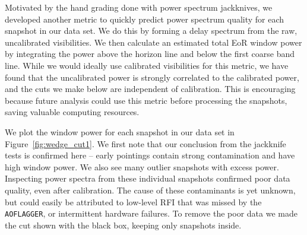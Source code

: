\documentclass[iop]{emulateapj}
\begin{document}
Motivated by the hand grading done with power spectrum jackknives, we developed 
another metric to quickly predict power spectrum quality for each snapshot in our data set. 
We do this by forming a delay spectrum \citep{Parsons:2012b} from the raw, uncalibrated 
visibilities. We then calculate an estimated total EoR window power by integrating the 
power above the horizon line and below the first coarse band line. While we would ideally 
use calibrated visibilities for this metric, we have found that the uncalibrated power is 
strongly correlated to the calibrated power, and the cuts we make below are independent of 
calibration. This is encouraging because future analysis could use this metric before 
processing the snapshots, saving valuable computing resources.

We plot the window power for each snapshot in our data set in Figure~\ref{fig:wedge_cut1}. 
We first note that our conclusion from the jackknife tests is confirmed here -- early pointings 
contain strong contamination and have high window power. We also see many outlier 
snapshots with excess power. Inspecting power spectra from these individual snapshots 
confirmed poor data quality, even after calibration. The cause of these contaminants is yet 
unknown, but could easily be attributed to low-level RFI that was missed by the 
\texttt{AOFLAGGER}, or intermittent hardware failures. To remove the poor data we made 
the cut shown with the black box, keeping only snapshots inside.
\end{document}
